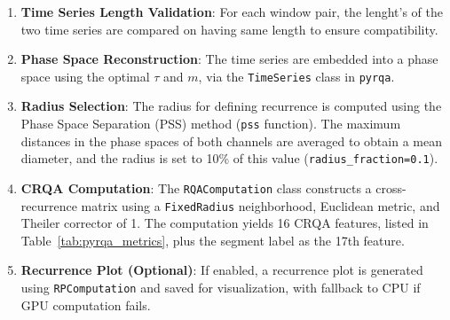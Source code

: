 \documentclass{article}
\begin{document}
				\begin{enumerate}
				    \item \textbf{Time Series Length Validation}: For each window pair, the lenght's of the two time series are compared on having same length to ensure compatibility.
				    \item \textbf{Phase Space Reconstruction}: The time series are embedded into a phase space using the optimal \(\tau\) and \(m\), via the \texttt{TimeSeries} class in \texttt{pyrqa}.
				    \item \textbf{Radius Selection}: The radius for defining recurrence is computed using the Phase Space Separation (PSS) method (\texttt{pss} function). The maximum distances in the phase spaces of both channels are averaged to obtain a mean diameter, and the radius is set to 10\% of this value (\texttt{radius\_fraction=0.1}).
				    \item \textbf{CRQA Computation}: The \texttt{RQAComputation} class constructs a cross-recurrence matrix using a \texttt{FixedRadius} neighborhood, Euclidean metric, and Theiler corrector of 1. The computation yields 16 CRQA features, listed in Table~\ref{tab:pyrqa_metrics}, plus the segment label as the 17th feature.
				    \item \textbf{Recurrence Plot (Optional)}: If enabled, a recurrence plot is generated using \texttt{RPComputation} and saved for visualization, with fallback to CPU if GPU computation fails.
				\end{enumerate}
\end{document}
